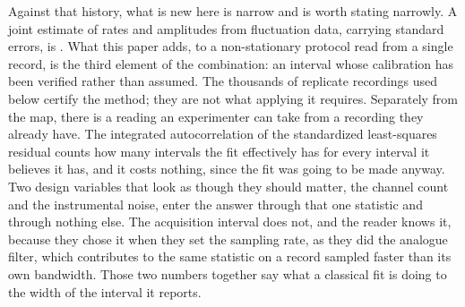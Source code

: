 Against that history, what is new here is narrow and is worth stating narrowly. A joint estimate of
rates and amplitudes from fluctuation data, carrying standard errors, is \citet{anderson1973voltage}.
What this paper adds, to a non-stationary protocol read from a single record, is the third element of
the combination: an interval whose calibration has been verified rather than assumed. The thousands of
replicate recordings used below certify the method; they are not what applying it requires. Separately
from the map, there is a reading an experimenter can take from a recording they already have. The
integrated autocorrelation of the standardized least-squares residual counts how many intervals the
fit effectively has for every interval it believes it has, and it costs nothing, since the fit was
going to be made anyway. Two design variables that look as though they should matter, the channel
count and the instrumental noise, enter the answer through that one statistic and through nothing
else. The acquisition interval does not, and the reader knows it, because they chose it when they set
the sampling rate, as they did the analogue filter, which contributes to the same statistic on a
record sampled faster than its own bandwidth. Those two numbers together say what a classical fit is
doing to the width of the interval it reports.
